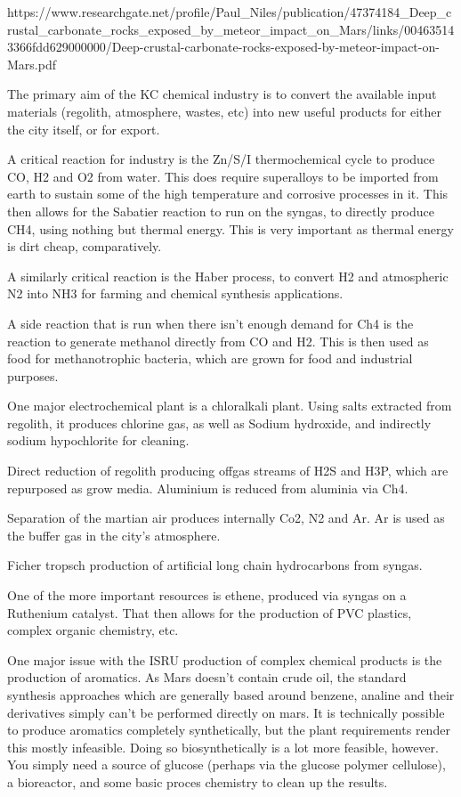 \documentclass[10pt]{article}
\begin{document}
https://www.researchgate.net/profile/Paul_Niles/publication/47374184_Deep_crustal_carbonate_rocks_exposed_by_meteor_impact_on_Mars/links/004635143366fdd629000000/Deep-crustal-carbonate-rocks-exposed-by-meteor-impact-on-Mars.pdf


The primary aim of the KC chemical industry is to convert the available input materials (regolith, atmosphere, wastes, etc) into new useful products for either the city itself, or for export.

A critical reaction for industry is the Zn/S/I thermochemical cycle to produce CO, H2 and O2 from water. This does require superalloys to be imported from earth to sustain some of the high temperature and corrosive processes in it. This then allows for the Sabatier reaction to run on the syngas, to directly produce CH4, using nothing but thermal energy. This is very important as thermal energy is dirt cheap, comparatively.

A similarly critical reaction is the Haber process, to convert H2 and atmospheric N2 into NH3 for farming and chemical synthesis applications.

A side reaction that is run when there isn't enough demand for Ch4 is the reaction to generate methanol directly from CO and H2. This is then used as food for methanotrophic bacteria, which are grown for food and industrial purposes.

One major electrochemical plant is a chloralkali plant. Using salts extracted from regolith, it produces chlorine gas, as well as Sodium hydroxide, and indirectly sodium hypochlorite for cleaning.

Direct reduction of regolith producing offgas streams of H2S and H3P, which are repurposed as grow media. Aluminium is reduced from aluminia via Ch4.

Separation of the martian air produces internally Co2, N2 and Ar. Ar is used as the buffer gas in the city's atmosphere.

Ficher tropsch production of artificial long chain hydrocarbons from syngas.

One of the more important resources is ethene, produced via syngas on a Ruthenium catalyst. That then allows for the production of PVC plastics, complex organic chemistry, etc.

One major issue with the ISRU production of complex chemical products is the production of aromatics. As Mars doesn't contain crude oil, the standard synthesis approaches which are generally based around benzene, analine and their derivatives simply can't be performed directly on mars. It is technically possible to produce aromatics completely synthetically, but the plant requirements render this mostly infeasible. Doing so biosynthetically is a lot more feasible, however. You simply need a source of glucose (perhaps via the glucose polymer cellulose), a bioreactor, and some basic proces chemistry to clean up the results.
\end{document}
